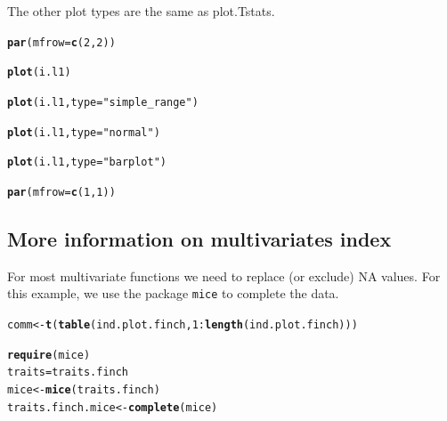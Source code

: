 \documentclass[12pt]{article}\usepackage[]{graphicx}\usepackage[]{color}
\makeatletter
\newcommand{\hlnum}[1]{\textcolor[rgb]{0.686,0.059,0.569}{#1}}%
\newcommand{\hlstr}[1]{\textcolor[rgb]{0.192,0.494,0.8}{#1}}%
\newcommand{\hlopt}[1]{\textcolor[rgb]{0,0,0}{#1}}%
\newcommand{\hlstd}[1]{\textcolor[rgb]{0.345,0.345,0.345}{#1}}%
\newcommand{\hlkwb}[1]{\textcolor[rgb]{0.69,0.353,0.396}{#1}}%
\newcommand{\hlkwc}[1]{\textcolor[rgb]{0.333,0.667,0.333}{#1}}%
\newcommand{\hlkwd}[1]{\textcolor[rgb]{0.737,0.353,0.396}{\textbf{#1}}}%
\newenvironment{kframe}{%
 \def\at@end@of@kframe{}%
 \ifinner\ifhmode%
  \def\at@end@of@kframe{\end{minipage}}%
  \begin{minipage}{\columnwidth}%
 \fi\fi%
 \def\FrameCommand##1{\hskip\@totalleftmargin \hskip-\fboxsep
 \colorbox{shadecolor}{##1}\hskip-\fboxsep
     \hskip-\linewidth \hskip-\@totalleftmargin \hskip\columnwidth}%
 \MakeFramed {\advance\hsize-\width
   \@totalleftmargin\z@ \linewidth\hsize
   \@setminipage}}%
 {\par\unskip\endMakeFramed%
 \at@end@of@kframe}
\newenvironment{knitrout}{}{} %
\makeatother
\begin{document}
The other plot types are the same as plot.Tstats.

\begin{knitrout}
\color{fgcolor}\begin{kframe}
\begin{alltt}
\hlkwd{par}\hlstd{(}\hlkwc{mfrow} \hlstd{=} \hlkwd{c}\hlstd{(}\hlnum{2}\hlstd{,}\hlnum{2}\hlstd{))}

\hlkwd{plot}\hlstd{(i.l1)}
\end{alltt}


{\ttfamily\noindent\bfseries\color{errorcolor}{\#\# Error: objet 'i.l1' introuvable}}\begin{alltt}
\hlkwd{plot}\hlstd{(i.l1,}\hlkwc{type} \hlstd{=} \hlstr{"simple_range"}\hlstd{)}
\end{alltt}


{\ttfamily\noindent\bfseries\color{errorcolor}{\#\# Error: objet 'i.l1' introuvable}}\begin{alltt}
\hlkwd{plot}\hlstd{(i.l1,}\hlkwc{type} \hlstd{=} \hlstr{"normal"}\hlstd{)}
\end{alltt}


{\ttfamily\noindent\bfseries\color{errorcolor}{\#\# Error: objet 'i.l1' introuvable}}\begin{alltt}
\hlkwd{plot}\hlstd{(i.l1,}\hlkwc{type} \hlstd{=} \hlstr{"barplot"}\hlstd{)}
\end{alltt}


{\ttfamily\noindent\bfseries\color{errorcolor}{\#\# Error: objet 'i.l1' introuvable}}\begin{alltt}
\hlkwd{par}\hlstd{(}\hlkwc{mfrow} \hlstd{=} \hlkwd{c}\hlstd{(}\hlnum{1}\hlstd{,}\hlnum{1}\hlstd{))}
\end{alltt}
\end{kframe}
\end{knitrout}



\newpage

\subsection{More information on multivariates index}

For most multivariate functions we need to replace (or exclude) NA values. For this example, we use the package \texttt{mice} to complete the data.

\begin{knitrout}
\color{fgcolor}\begin{kframe}
\begin{alltt}
\hlstd{comm}\hlkwb{<-}\hlkwd{t}\hlstd{(}\hlkwd{table}\hlstd{(ind.plot.finch,}\hlnum{1}\hlopt{:}\hlkwd{length}\hlstd{(ind.plot.finch)))}

\hlkwd{require}\hlstd{(mice)}
\hlstd{traits} \hlkwb{=} \hlstd{traits.finch}
\hlstd{mice}\hlkwb{<-}\hlkwd{mice}\hlstd{(traits.finch)}
\hlstd{traits.finch.mice}\hlkwb{<-}\hlkwd{complete}\hlstd{(mice)}
\end{alltt}
\end{kframe}
\end{knitrout}
\end{document}
